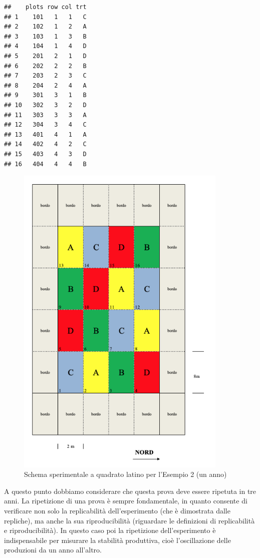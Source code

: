 \documentclass[a4paper,12pt,oneside]{book}
\begin{document}
\begin{verbatim}
##    plots row col trt
## 1    101   1   1   C
## 2    102   1   2   A
## 3    103   1   3   B
## 4    104   1   4   D
## 5    201   2   1   D
## 6    202   2   2   B
## 7    203   2   3   C
## 8    204   2   4   A
## 9    301   3   1   B
## 10   302   3   2   D
## 11   303   3   3   A
## 12   304   3   4   C
## 13   401   4   1   A
## 14   402   4   2   C
## 15   403   4   3   D
## 16   404   4   4   B
\end{verbatim}

\begin{figure}
\centering
\includegraphics[width=0.90000\textwidth]{_images/Mappa2LS.png}
\caption{Schema sperimentale a quadrato latino per l'Esempio 2 (un
anno)}
\end{figure}

A questo punto dobbiamo considerare che questa prova deve essere
ripetuta in tre anni. La ripetizione di una prova è sempre fondamentale,
in quanto consente di verificare non solo la replicabilità
dell'esperimento (che è dimostrata dalle repliche), ma anche la sua
riproducibilità (riguardare le definizioni di replicabilità e
riproducibilità). In questo caso poi la ripetizione dell'esperimento è
indispensabile per misurare la stabilità produttiva, cioè l'oscillazione
delle produzioni da un anno all'altro.
\end{document}
